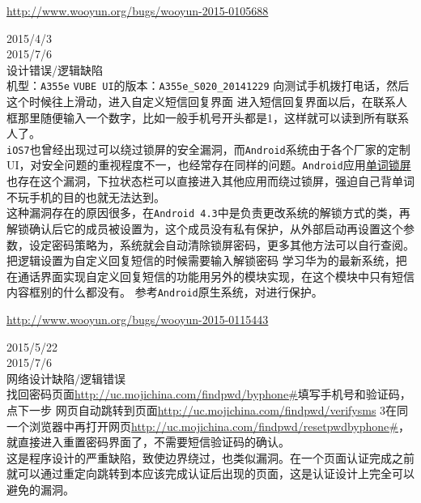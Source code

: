 \documentclass{leptc}
\begin{document}
\begin{center}
\end{center}

\begin{center}
	\url{http://www.wooyun.org/bugs/wooyun-2015-0105688}
\end{center}

 2015/4/3 \\
 2015/7/6 \\
 设计错误/逻辑缺陷 \\
  机型：\texttt{A355e}  \texttt{VUBE UI}的版本：\verb|A355e_S020_20141229|  向测试手机拨打电话，然后这个时候往上滑动，进入自定义短信回复界面  进入短信回复界面以后，在联系人框那里随便输入一个数字，比如一般手机号开头都是1，这样就可以读到所有联系人了。\\
 \texttt{iOS7}也曾经出现过可以绕过锁屏的安全漏洞，而\texttt{Android}系统由于各个厂家的定制UI，对安全问题的重视程度不一，也经常存在同样的问题。\texttt{Android}应用\href{http://secretlisa.com/words-screen-lock/}{单词锁屏}也存在这个漏洞，下拉状态栏可以直接进入其他应用而绕过锁屏，强迫自己背单词不玩手机的目的也就无法达到。\\
这种漏洞存在的原因很多，在\texttt{Android 4.3}中是负责更改系统的解锁方式的类，再解锁确认后它的成员被设置为，这个成员没有私有保护，从外部启动再设置这个参数，设定密码策略为，系统就会自动清除锁屏密码，更多其他方法可以自行查阅。\\
  把逻辑设置为自定义回复短信的时候需要输入解锁密码  学习华为的最新系统，把在通话界面实现自定义回复短信的功能用另外的模块实现，在这个模块中只有短信内容框别的什么都没有。  参考\texttt{Android}原生系统，对进行保护。\\

\begin{center}
	\url{http://www.wooyun.org/bugs/wooyun-2015-0115443}
\end{center}
 2015/5/22 \\
 2015/7/6 \\
 网络设计缺陷/逻辑错误 \\
  找回密码页面\url{http://uc.mojichina.com/findpwd/byphone#}填写手机号和验证码，点下一步  网页自动跳转到页面\url{http://uc.mojichina.com/findpwd/verifysms} \N3在同一个浏览器中再打开网页\url{http://uc.mojichina.com/findpwd/resetpwdbyphone#}，就直接进入重置密码界面了，不需要短信验证码的确认。\\
 这是程序设计的严重缺陷，致使边界绕过，也类似漏洞。在一个页面认证完成之前就可以通过重定向跳转到本应该完成认证后出现的页面，这是认证设计上完全可以避免的漏洞。\\
\end{document}
